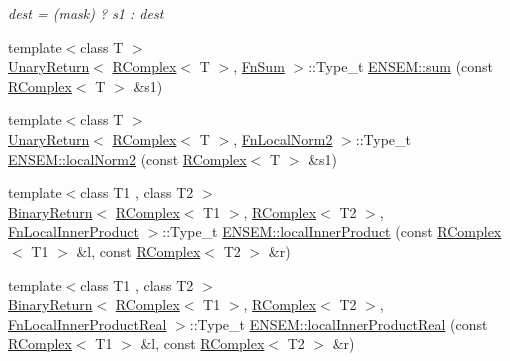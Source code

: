 \begin{DoxyCompactItemize}
\begin{DoxyCompactList}\small\item\em dest = (mask) ? s1 \+: dest \end{DoxyCompactList}\item 
{\footnotesize template$<$class T $>$ }\\\mbox{\hyperlink{structENSEM_1_1UnaryReturn}{Unary\+Return}}$<$ \mbox{\hyperlink{classENSEM_1_1RComplex}{R\+Complex}}$<$ T $>$, \mbox{\hyperlink{structENSEM_1_1FnSum}{Fn\+Sum}} $>$\+::Type\+\_\+t \mbox{\hyperlink{group__rcomplex_ga402ccaab21c1a8ce0e99c8d2b1ee1c53}{E\+N\+S\+E\+M\+::sum}} (const \mbox{\hyperlink{classENSEM_1_1RComplex}{R\+Complex}}$<$ T $>$ \&s1)
\item 
{\footnotesize template$<$class T $>$ }\\\mbox{\hyperlink{structENSEM_1_1UnaryReturn}{Unary\+Return}}$<$ \mbox{\hyperlink{classENSEM_1_1RComplex}{R\+Complex}}$<$ T $>$, \mbox{\hyperlink{structENSEM_1_1FnLocalNorm2}{Fn\+Local\+Norm2}} $>$\+::Type\+\_\+t \mbox{\hyperlink{group__rcomplex_gaeb6b484f4bb6decc4552e2c635452b3f}{E\+N\+S\+E\+M\+::local\+Norm2}} (const \mbox{\hyperlink{classENSEM_1_1RComplex}{R\+Complex}}$<$ T $>$ \&s1)
\item 
{\footnotesize template$<$class T1 , class T2 $>$ }\\\mbox{\hyperlink{structENSEM_1_1BinaryReturn}{Binary\+Return}}$<$ \mbox{\hyperlink{classENSEM_1_1RComplex}{R\+Complex}}$<$ T1 $>$, \mbox{\hyperlink{classENSEM_1_1RComplex}{R\+Complex}}$<$ T2 $>$, \mbox{\hyperlink{structENSEM_1_1FnLocalInnerProduct}{Fn\+Local\+Inner\+Product}} $>$\+::Type\+\_\+t \mbox{\hyperlink{group__rcomplex_ga4ccc8c0a3c54b7eb19e0d5aa1c6ac89d}{E\+N\+S\+E\+M\+::local\+Inner\+Product}} (const \mbox{\hyperlink{classENSEM_1_1RComplex}{R\+Complex}}$<$ T1 $>$ \&l, const \mbox{\hyperlink{classENSEM_1_1RComplex}{R\+Complex}}$<$ T2 $>$ \&r)
\item 
{\footnotesize template$<$class T1 , class T2 $>$ }\\\mbox{\hyperlink{structENSEM_1_1BinaryReturn}{Binary\+Return}}$<$ \mbox{\hyperlink{classENSEM_1_1RComplex}{R\+Complex}}$<$ T1 $>$, \mbox{\hyperlink{classENSEM_1_1RComplex}{R\+Complex}}$<$ T2 $>$, \mbox{\hyperlink{structENSEM_1_1FnLocalInnerProductReal}{Fn\+Local\+Inner\+Product\+Real}} $>$\+::Type\+\_\+t \mbox{\hyperlink{group__rcomplex_ga1480abb301211dfb7c0071739fce6a6a}{E\+N\+S\+E\+M\+::local\+Inner\+Product\+Real}} (const \mbox{\hyperlink{classENSEM_1_1RComplex}{R\+Complex}}$<$ T1 $>$ \&l, const \mbox{\hyperlink{classENSEM_1_1RComplex}{R\+Complex}}$<$ T2 $>$ \&r)

\end{DoxyCompactItemize}
